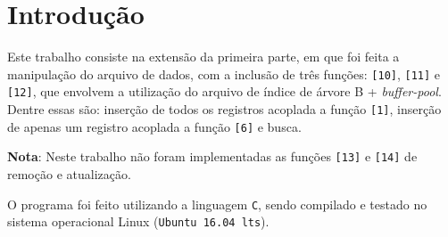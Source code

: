 \documentclass[
	12pt,				%
	openany,			%
	twoside,			%
	a4paper,			%
	english,			%
	french,				%
	spanish,			%
	brazil,				%
	]{abntex2}
\begin{document}

\frenchspacing 


\imprimircapa


\tableofcontents*
\cleardoublepage


\textual

\section{Introdução}

Este trabalho consiste na extensão da primeira parte, em que foi feita a manipulação do arquivo de dados, com a inclusão de três funções: \verb|[10]|, \verb|[11]| e \verb|[12]|, que envolvem a utilização do arquivo de índice de árvore B + \textit{buffer-pool}. Dentre essas são: inserção de todos os registros acoplada a função \verb|[1]|, inserção de apenas um registro acoplada a função \verb|[6]| e busca.

\textbf{Nota}: Neste trabalho não foram implementadas as funções \verb|[13]| e \verb|[14]| de remoção e atualização.

O programa foi feito utilizando a linguagem \verb|C|, sendo compilado e testado no sistema operacional Linux (\verb|Ubuntu 16.04 lts|).
\end{document}
